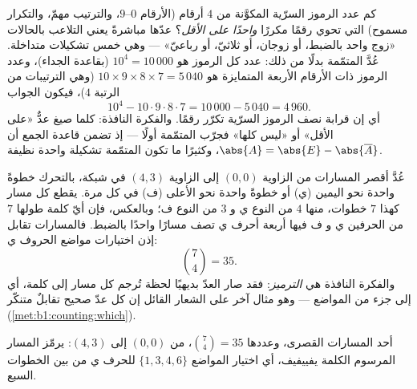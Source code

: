 \begin{example}\label{ex:b1:counting:complement}
كم عدد الرموز السرّية المكوَّنة من $4$ أرقام (الأرقام $0$--$9$،
والترتيب مهمّ، والتكرار مسموح) التي تحوي رقمًا مكررًا \emph{واحدًا
على الأقل}؟ عدّها مباشرةً يعني التلاعب بالحالات «زوج واحد بالضبط،
أو زوجان، أو ثلاثيّ، أو رباعيّ» --- وهي خمس تشكيلات متداخلة.
عُدَّ المتمّمة بدلًا من ذلك: عدد كل الرموز هو
$10^4 = 10\,000$ (بقاعدة الجداء)، وعدد الرموز ذات الأرقام الأربعة
المتمايزة هو $10 \times 9 \times 8 \times 7 = 5\,040$
(وهي الترتيبات من الرتبة $4$)، فيكون الجواب
\[
10^4 - 10 \cdot 9 \cdot 8 \cdot 7 = 10\,000 - 5\,040 = 4\,960 .
\]
أي إن قرابة نصف الرموز السرّية تكرّر رقمًا. والفكرة النافذة: كلما
صيغ عدٌّ  «على الأقل» أو «ليس كلها» فجرّب المتمّمة
أولًا --- إذ تضمن قاعدة الجمع أن
$\abs{A} = \abs{E} - \abs{\overline A}$، وكثيرًا ما تكون المتمّمة
تشكيلة واحدة نظيفة.
\end{example}

\begin{example}\label{ex:b1:counting:paths}
عُدَّ أقصر المسارات من الزاوية $(0,0)$ إلى الزاوية
$(4, 3)$ في شبكة، بالتحرك خطوةً واحدة نحو اليمين (ي) أو خطوةً
واحدة نحو الأعلى (ف) في كل مرة. يقطع كل مسار كهذا $7$ خطوات،
منها $4$ من النوع ي و $3$ من النوع ف؛ وبالعكس، فإن أيّ كلمة طولها
$7$ من الحرفين ي و ف فيها أربعة أحرف ي تصف مسارًا واحدًا بالضبط.
فالمسارات تقابل إذن اختيارات مواضع الحروف ي:
\[
\binom{7}{4} = 35 .
\]
والفكرة النافذة هي \emph{الترميز}: فقد صار العدّ بديهيًا لحظة
تُرجم كل مسار إلى كلمة، أي إلى جزء من المواضع --- وهو مثال آخر
على الشعار القائل إن كل عدّ صحيح تقابلٌ متنكّر (\cref{met:b1:counting:which}).
\end{example}

\begin{omfigure}

{\small أحد المسارات القصرى، وعددها $\binom74 = 35$، من $(0,0)$ إلى
$(4,3)$: يرمّز المسار المرسوم الكلمة يفييفيف، أي اختيار
المواضع $\{1,3,4,6\}$ للحرف ي من بين الخطوات السبع.}
\end{omfigure}

